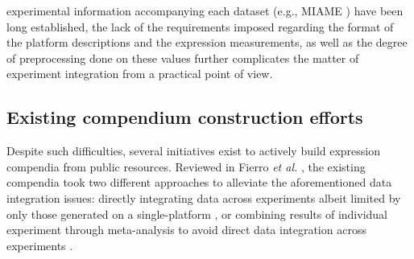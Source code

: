 experimental information accompanying each dataset (e.g., MIAME
\cite{Brazma2001}) have been long established, the lack of the requirements
\cite{Brazma2009} imposed regarding the format of the platform descriptions and
the expression measurements, as well as the degree of preprocessing done on
these values further complicates the matter of experiment integration from a
practical point of view.
%




\subsection{Existing compendium construction efforts}

Despite such difficulties, several initiatives exist to actively build
expression compendia from public resources.
%
Reviewed in Fierro \textit{et al.} \cite{Fierro2008}, the existing compendia
took two different approaches to alleviate the aforementioned data integration
issues: directly integrating data across experiments albeit limited by only
those generated on a single-platform \cite{Faith2008, Hruz2008}, or combining
results of individual experiment through meta-analysis to avoid direct data
integration across experiments \cite{Rhodes2007, Pan2007, Elfilali2006,
  Kapushesky2010, Culhane2012}.



